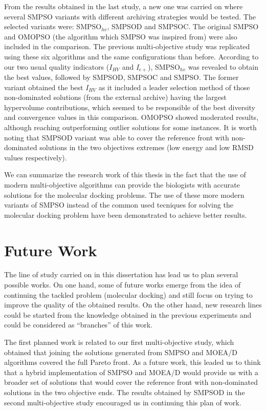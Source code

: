 From the results obtained in the last study, a new one was carried on where several SMPSO variants with different archiving strategies would be tested. The selected variants were: SMPSO$_{hv}$, SMPSOD and  SMPSOC. The original SMPSO and OMOPSO (the algorithm which SMPSO was inspired from) were also included in the comparison. The previous multi-objective study was replicated using these six algorithms and the same configurations than before. According to our two usual quality indicators ($I_{HV}$ and $I_{\epsilon+}$), SMPSO$_{hv}$ was revealed to obtain the best values, followed by SMPSOD, SMPSOC and SMPSO. The former variant obtained the best $I_{HV}$ as it included a leader selection method of those non-dominated solutions (from the external archive) having the largest hypervolume contributions, which seemed to be responsible of the best diversity and convergence values in this comparison. OMOPSO showed moderated results, although reaching outperforming outlier solutions for some instances. It is worth noting that SMPSOD variant was able to cover the reference front with non-dominated solutions in the two objectives extremes (low energy and low RMSD values respectively).

We can summarize the research work of this thesis in the fact that the use of modern multi-objective algorithms can provide the biologists with accurate solutions for the molecular docking problems. The use of these more modern variants of SMPSO instead of the common used tecniques for solving the molecular docking problem have been demonstrated to achieve better results.

\section{Future Work}
\label{sec:futureWorks}

The line of study carried on in this dissertation has lead us to plan several possible works. On one hand, some of future works emerge from the idea of continuing the tackled problem (molecular docking) and still focus on trying to improve the quality of the obtained results. On the other hand, new research lines could be started from the knowledge obtained in the previous experiments and could be considered as ``branches'' of this work.

The first planned work is related to our first multi-objective study, which obtained that joining the solutions generated from SMPSO and MOEA/D algorithms covered the full Pareto front. As a future work, this leaded us to think that a hybrid implementation of SMPSO and MOEA/D would provide us with a broader set of solutions that would cover the reference front with non-dominated solutions in the two objective ends. The results obtained by SMPSOD in the second multi-objective study encouraged us in continuing this plan of work.


